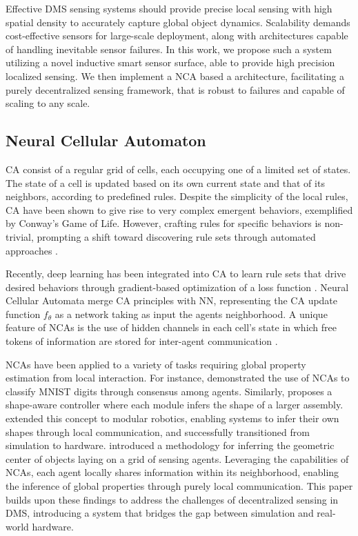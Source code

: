 Effective \ac{DMS} sensing systems should provide precise local sensing with high spatial density to accurately capture global object dynamics. Scalability demands cost-effective sensors for large-scale deployment, along with architectures  capable of handling inevitable sensor failures. In this work, we propose such a system utilizing a novel inductive smart sensor surface, able to provide high precision localized sensing. We then implement a \acf{NCA} based a architecture, facilitating a purely decentralized sensing framework, that is robust to failures and capable of scaling to any scale.



\subsection{Neural Cellular Automaton}

\acf{CA} consist of a regular grid of cells, each occupying one of a limited set of states. The state of a cell is updated based on its own current state and that of its neighbors, according to predefined rules. Despite the simplicity of the local rules, \ac{CA} have been shown to give rise to very complex emergent behaviors, exemplified by Conway’s Game of Life\cite{adamatzky_game_2010}. However, crafting rules for specific behaviors is non-trivial, prompting a shift toward discovering rule sets through automated approaches \cite{wolfram2021problem}.

Recently, deep learning has been integrated into \ac{CA} to learn rule sets that drive desired behaviors through gradient-based optimization of a loss function \cite{ha_collective_2022, gilpin_cellular_2019}. Neural Cellular Automata merge \ac{CA} principles with \ac{NN}, representing the \ac{CA} update function $f_{\theta}$ as a network taking as input the agents neighborhood. A unique feature of \ac{NCA}s is the use of hidden channels in each cell’s state in which free tokens of information are stored for inter-agent communication \cite{wulff_learning_1992,mordvintsev_growing_2020}.

\acp{NCA} have been applied to a variety of tasks requiring global property estimation from local interaction. 
For instance, \cite{randazzo_self-classifying_2020} demonstrated the use of \acp{NCA} to classify MNIST digits through consensus among agents. Similarly, \cite{nadizar_fully-distributed_2023} proposes a shape-aware controller where each module infers the shape of a larger assembly. \cite{walker_physical_2022} extended this concept to modular robotics, enabling systems to infer their own shapes through local communication, and successfully transitioned from simulation to hardware.\cite{bessone_neural_2025} introduced a methodology for inferring the geometric center of objects laying on a grid of sensing agents. Leveraging the capabilities of \acp{NCA}, each agent locally shares information within its neighborhood, enabling the inference of global properties through purely local communication.
This paper builds upon these findings to address the challenges of decentralized sensing in \ac{DMS}, introducing a system that bridges the gap between simulation and real-world hardware.
